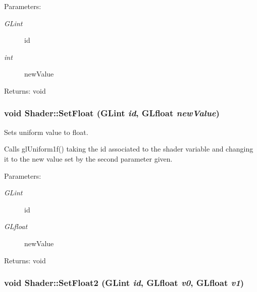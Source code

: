 \begin{Desc}
\item[Parameters:]
\begin{description}
\item[{\em GLint}]id \item[{\em int}]newValue \end{description}
\end{Desc}
\begin{Desc}
\item[Returns:]void \end{Desc}
\hypertarget{class_shader_df02f121177b2723321441701361fab4}{
\subsubsection[SetFloat]{\setlength{\rightskip}{0pt plus 5cm}void Shader::SetFloat (GLint {\em id}, \/  GLfloat {\em newValue})}}
\label{class_shader_df02f121177b2723321441701361fab4}


Sets uniform value to float. 

Calls glUniform1f() taking the id associated to the shader variable and changing it to the new value set by the second parameter given.

\begin{Desc}
\item[Parameters:]
\begin{description}
\item[{\em GLint}]id \item[{\em GLfloat}]newValue \end{description}
\end{Desc}
\begin{Desc}
\item[Returns:]void \end{Desc}
\hypertarget{class_shader_8c50bc3b65790489f1538867face7b81}{
\subsubsection[SetFloat2]{\setlength{\rightskip}{0pt plus 5cm}void Shader::SetFloat2 (GLint {\em id}, \/  GLfloat {\em v0}, \/  GLfloat {\em v1})}}
\label{class_shader_8c50bc3b65790489f1538867face7b81}


